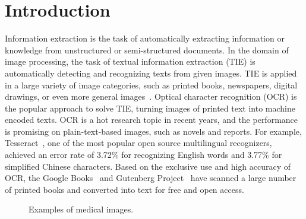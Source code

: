 \section{Introduction}
\label{sec:intro}

Information extraction is the task of automatically extracting information
or knowledge from unstructured or semi-structured documents.
In the domain of image processing,
the task of textual information extraction (TIE)
is automatically detecting and recognizing texts from given images.
TIE is applied in a large variety of image categories,
such as printed books, newspapers, digital drawings,
or even more general images~\cite{jung2004text}.
Optical character recognition (OCR) is the popular approach to solve TIE,
turning images of printed text into machine encoded texts.
OCR is a hot research topic in recent years, and the performance is promising
on plain-text-based images, such as novels and reports.
For example, Tesseract~\cite{smith2007overview},
one of the most popular open source multilingual recognizers,
achieved an error rate of 3.72\% for recognizing English words
and 3.77\% for simplified Chinese characters\cite{smith2009adapting}.
Based on the exclusive use and high accuracy of OCR,
the Google Books~\cite{vincent2007google} and Gutenberg Project~\cite{lebert2008project}
have scanned a large number of printed books
and converted into text for free and open access.

\begin{figure}[!htb]
\centering
{}
{}
\caption{Examples of medical images.}
\label{fig:med-image-example}
\end{figure}


